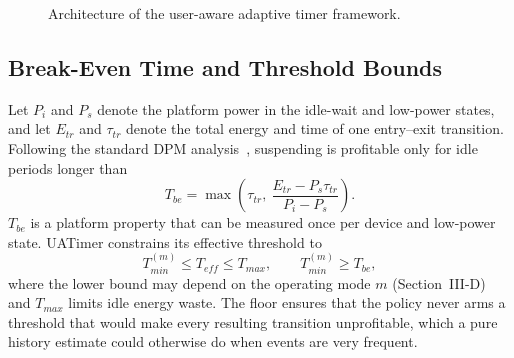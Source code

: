 \documentclass[journal]{IEEEtran}
\begin{document}
\begin{figure}[t]
\centering
{}
\caption{Architecture of the user-aware adaptive timer framework.}
\label{fig:arch}
\end{figure}

\subsection{Break-Even Time and Threshold Bounds}
Let $P_{i}$ and $P_{s}$ denote the platform power in the idle-wait and low-power states, and let $E_{tr}$ and $\tau_{tr}$ denote the total energy and time of one entry--exit transition. Following the standard DPM analysis~\cite{benini2000survey}, suspending is profitable only for idle periods longer than
\begin{equation}
T_{be}=\max\!\left(\tau_{tr},\ \frac{E_{tr}-P_{s}\tau_{tr}}{P_{i}-P_{s}}\right).
\label{eq:breakeven}
\end{equation}
$T_{be}$ is a platform property that can be measured once per device and low-power state. UATimer constrains its effective threshold to
\begin{equation}
T_{min}^{(m)} \le T_{eff} \le T_{max},\qquad T_{min}^{(m)}\ge T_{be},
\label{eq:bounds}
\end{equation}
where the lower bound may depend on the operating mode $m$ (Section~III-D) and $T_{max}$ limits idle energy waste. The floor ensures that the policy never arms a threshold that would make every resulting transition unprofitable, which a pure history estimate could otherwise do when events are very frequent.
\end{document}
